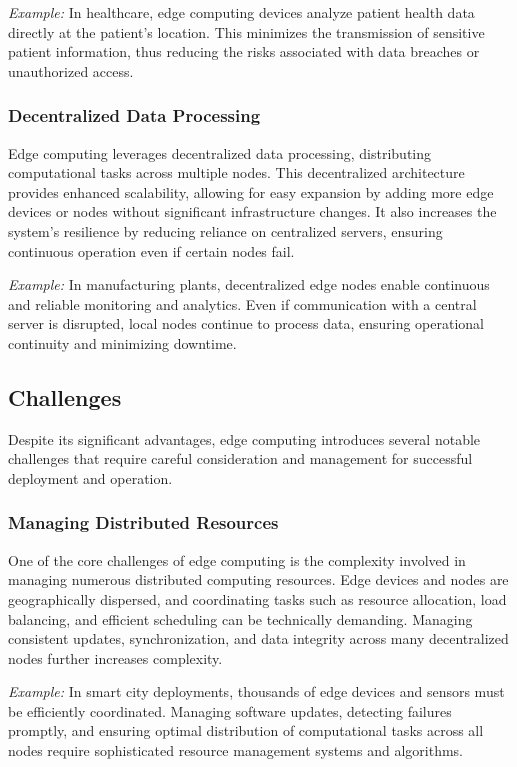 \documentclass[runningheads]{llncs}
\begin{document}
\textit{Example:} In healthcare, edge computing devices analyze patient health data directly at the patient's location. This minimizes the transmission of sensitive patient information, thus reducing the risks associated with data breaches or unauthorized access.

\subsubsection{Decentralized Data Processing}
Edge computing leverages decentralized data processing, distributing computational tasks across multiple nodes. This decentralized architecture provides enhanced scalability, allowing for easy expansion by adding more edge devices or nodes without significant infrastructure changes. It also increases the system’s resilience by reducing reliance on centralized servers, ensuring continuous operation even if certain nodes fail.

\textit{Example:} In manufacturing plants, decentralized edge nodes enable continuous and reliable monitoring and analytics. Even if communication with a central server is disrupted, local nodes continue to process data, ensuring operational continuity and minimizing downtime.


\subsection{Challenges}

Despite its significant advantages, edge computing introduces several notable challenges that require careful consideration and management for successful deployment and operation.

\subsubsection{Managing Distributed Resources}
One of the core challenges of edge computing is the complexity involved in managing numerous distributed computing resources. Edge devices and nodes are geographically dispersed, and coordinating tasks such as resource allocation, load balancing, and efficient scheduling can be technically demanding. Managing consistent updates, synchronization, and data integrity across many decentralized nodes further increases complexity.

\textit{Example:} In smart city deployments, thousands of edge devices and sensors must be efficiently coordinated. Managing software updates, detecting failures promptly, and ensuring optimal distribution of computational tasks across all nodes require sophisticated resource management systems and algorithms.
\end{document}
